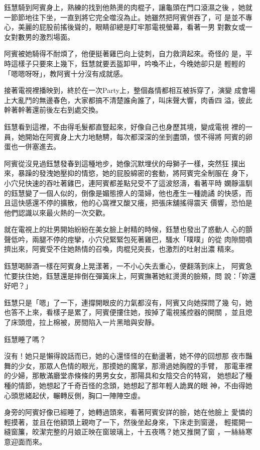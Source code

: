 鈺慧騎到阿賓身上，熟練的找到他熱燙的肉棍子，讓龜頭在門口滾濕之後
，她就一節節地往下坐，一直到將它完全噬沒為止。她雖然把阿賓併吞了，可
是並不專心，美麗的屁股前搖後聳的，眼睛卻總是盯牢那電視螢幕，看著一男
對數女或一女對數男的激烈場面。

阿賓被她騎得不耐煩了，他便挺著雞巴向上徒刺，自力救濟起來。奇怪的
是，平時這樣子只要來上幾下，鈺慧就要丟盔卸甲，吟喚不止，今晚她卻只是
輕輕的「嗯嗯呀呀」，教阿賓十分沒有成就感。

接著電視裡播映到，終於在一次Party上，整個姦情都相互被拆穿了，演變
成會場上大亂鬥的無邊春色，大家都搞不清楚誰肏誰了，叫床聲大響，肉香四
溢，彼此幹著幹著還前後左右到處交換。

鈺慧看到這裡，不由得毛髮都直豎起來，好像自己也身歷其境，變成電視
裡的一員，她開始在阿賓身上大力地馳騁，每次都深深的坐到盡頭，恨不得將
阿賓的卵蛋也一併塞進去。

阿賓從沒見過鈺慧發春到這種地步，她像沉默埋伏的母獅子一樣，突然狂
撲出來，暴躁的發洩她壓抑的情慾，她的屁股綿密的套動，將阿賓完全制服在
身下，小穴兒快速的吞吐著雞巴，連阿賓都差點兒受不了這波怒濤，看著平時
嫻靜溫馴的鈺慧變了一個人似的，倒像是媚態撩人的蕩婦，他也產生一種詭譎
的快感，而且這快感還不停的擴散，他的心窩裡又酸又癢，把張床舖搖得震天
價響，恐怕是他們認識以來最火熱的一次交歡。

就在電視上的壯男開始紛紛在美女臉上射精的時候，鈺慧也發出了惑動人
心的顫聲低吟，兩腿不停的痙攣，小穴兒緊緊包死著雞巴，騷水「噗噗」的從
肉隙間噴擠出來，阿賓受不住她熱情的召喚，肉棍兒突長，也激烈的吐射出濃
精來。

鈺慧喝醉酒一樣在阿賓身上晃漾著，一不小心失去重心，便翻落到床上，
阿賓急忙要扶住她，鈺慧還是摔倒在彈簧床上，阿賓撫著她紅燙燙的臉頰，問
說：「妳還好吧？」

鈺慧只是「嗯」了一下，連撐開眼皮的力氣都沒有，阿賓又向她探問了幾
句，她也答不上來，看樣子是累了，阿賓便摟住她，按掉了電視搖控器的開關
，並且熄了床頭燈，拉上棉被，房間陷入一片黑暗與安靜。

鈺慧睡了嗎？

沒有！她只是懶得說話而已，她的心還怪怪的在動盪著，她不停的回想那
夜市豔舞的少女，那眾人色情的眼光，那摸她的魔掌，那滑過她胸膛的手臂，
那電車裡的少婦，那散滿廳堂赤條條的男男女女，那陽具和女陰交合的特寫，
她想起了種種的情節，她想起了千奇百怪的念頭，她想起了那年輕人詭異的眼
神，不由得她心頭思緒起伏，輾轉反側，胸口一陣陣空虛。

身旁的阿賓好像已經睡了，她轉過頭來，看著阿賓安詳的臉，她在他臉上
愛憐的輕摸著，並且在他額頭上親吻了一下，然後坐起身來，下床走到窗邊，
輕擺開一縫窗簾，皎潔完整的月娘正映在窗玻璃上，十五夜嗎？她又推開了窗
，一絲絲寒意迎面而來。

